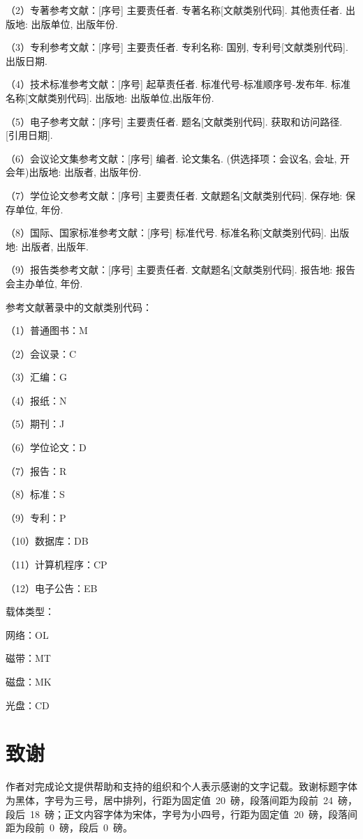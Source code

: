 （2）专著参考文献：[序号] 主要责任者. 专著名称[文献类别代码]. 其他责任者. 出版地: 出版单位, 出版年份.

（3）专利参考文献：[序号] 主要责任者. 专利名称: 国别, 专利号[文献类别代码]. 出版日期.

（4）技术标准参考文献：[序号] 起草责任者. 标准代号-标准顺序号-发布年. 标准名称[文献类别代码]. 出版地: 出版单位,出版年份.

（5）电子参考文献：[序号] 主要责任者. 题名[文献类别代码]. 获取和访问路径. [引用日期].

（6）会议论文集参考文献：[序号] 编者. 论文集名. (供选择项：会议名, 会址, 开会年)出版地: 出版者, 出版年份.

（7）学位论文参考文献：[序号]  主要责任者. 文献题名[文献类别代码]. 保存地: 保存单位, 年份.

（8）国际、国家标准参考文献：[序号] 标准代号. 标准名称[文献类别代码]. 出版地: 出版者, 出版年.

（9）报告类参考文献：[序号] 主要责任者. 文献题名[文献类别代码]. 报告地: 报告会主办单位, 年份.

参考文献著录中的文献类别代码：

（1）普通图书：M     \par
（2）会议录：C       \par
（3）汇编：G         \par
（4）报纸：N         \par
（5）期刊：J         \par
（6）学位论文：D     \par
（7）报告：R         \par
（8）标准：S         \par
（9）专利：P         \par
（10）数据库：DB     \par
（11）计算机程序：CP \par
（12）电子公告：EB   \par
载体类型：           \par
网络：OL             \par
磁带：MT             \par
磁盘：MK             \par
光盘：CD

\section{致谢}

作者对完成论文提供帮助和支持的组织和个人表示感谢的文字记载。致谢标题字体为黑体，字号为三号，居中排列，行距为固定值~20~磅，段落间距为段前~24~磅，段后~18~磅；正文内容字体为宋体，字号为小四号，行距为固定值~20~磅，段落间距为段前~0~磅，段后~0~磅。

